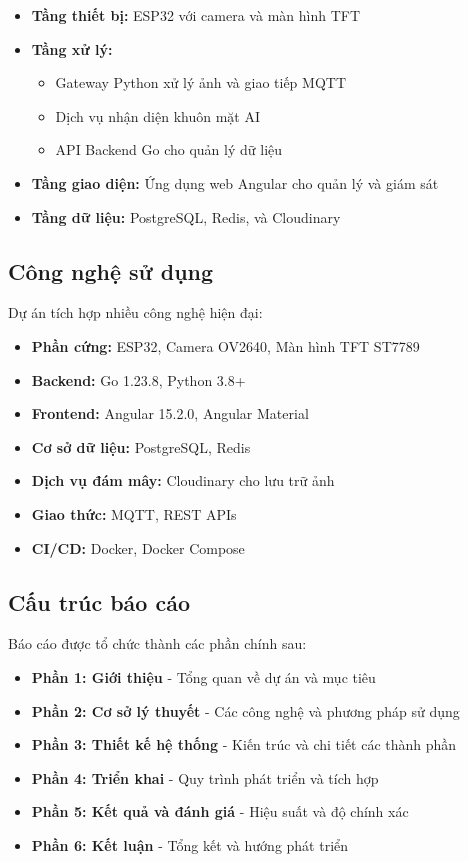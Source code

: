 \begin{itemize}
    \item \textbf{Tầng thiết bị:} ESP32 với camera và màn hình TFT
    \item \textbf{Tầng xử lý:} 
    \begin{itemize}
        \item Gateway Python xử lý ảnh và giao tiếp MQTT
        \item Dịch vụ nhận diện khuôn mặt AI
        \item API Backend Go cho quản lý dữ liệu
    \end{itemize}
    \item \textbf{Tầng giao diện:} Ứng dụng web Angular cho quản lý và giám sát
    \item \textbf{Tầng dữ liệu:} PostgreSQL, Redis, và Cloudinary
\end{itemize}

\subsection{Công nghệ sử dụng}
\hspace{0.5cm}Dự án tích hợp nhiều công nghệ hiện đại:

\begin{itemize}
    \item \textbf{Phần cứng:} ESP32, Camera OV2640, Màn hình TFT ST7789
    \item \textbf{Backend:} Go 1.23.8, Python 3.8+
    \item \textbf{Frontend:} Angular 15.2.0, Angular Material
    \item \textbf{Cơ sở dữ liệu:} PostgreSQL, Redis
    \item \textbf{Dịch vụ đám mây:} Cloudinary cho lưu trữ ảnh
    \item \textbf{Giao thức:} MQTT, REST APIs
    \item \textbf{CI/CD:} Docker, Docker Compose
\end{itemize}

\subsection{Cấu trúc báo cáo}
\hspace{0.5cm}Báo cáo được tổ chức thành các phần chính sau:

\begin{itemize}
    \item \textbf{Phần 1: Giới thiệu} - Tổng quan về dự án và mục tiêu
    \item \textbf{Phần 2: Cơ sở lý thuyết} - Các công nghệ và phương pháp sử dụng
    \item \textbf{Phần 3: Thiết kế hệ thống} - Kiến trúc và chi tiết các thành phần
    \item \textbf{Phần 4: Triển khai} - Quy trình phát triển và tích hợp
    \item \textbf{Phần 5: Kết quả và đánh giá} - Hiệu suất và độ chính xác
    \item \textbf{Phần 6: Kết luận} - Tổng kết và hướng phát triển
\end{itemize}
